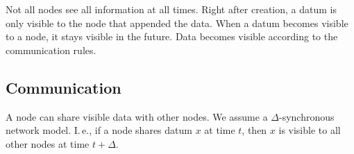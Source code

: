 Not all nodes see all information at all times.
Right after creation, a datum is only visible to the node that appended the data.
When a datum becomes visible to a node, it stays visible in the future.
Data becomes visible according to the communication rules.

\subsection{Communication} \label{sec:communication}

A node can share visible data with other nodes.
We assume a $\Delta$-synchronous network model.
I.\,e., if a node shares datum $x$ at time $t$, then $x$ is visible to all other nodes at time $t + \Delta$.
